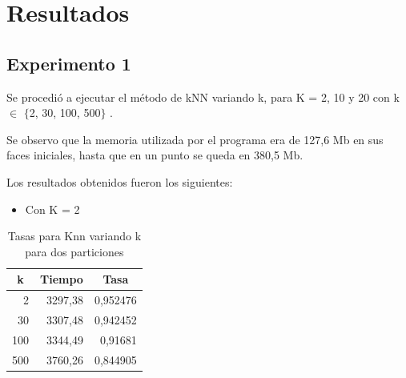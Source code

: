 \section{Resultados}



\subsection{Experimento 1}
Se procedió a ejecutar el método de kNN variando k, para K = 2, 10 y 20 con k $\in$ $\{$2, 30, 100, 500$\}$ .

Se observo que la memoria utilizada por el programa era de 127,6 Mb en sus faces iniciales, hasta que en un punto se queda en 380,5 Mb.

Los resultados obtenidos fueron los siguientes:
\begin{itemize}
\item Con K = 2\\
\end{itemize}

\begin{table}[H]
\centering
\begin{tabular}{|r|r|r|}
\hline
\multicolumn{1}{|c|}{k} & \multicolumn{1}{c|}{Tiempo} & \multicolumn{1}{c|}{Tasa} \\ \hline
2 & 3297,38 & 0,952476 \\ \hline
30 & 3307,48 & 0,942452 \\ \hline
100 & 3344,49 & 0,91681 \\ \hline
500 & 3760,26 & 0,844905 \\ \hline
\end{tabular}
\caption{Tasas para Knn variando k para dos particiones}
\label{}
\end{table}

\bigskip
\bigskip
\bigskip

